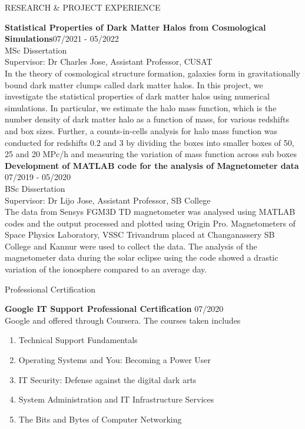 \documentclass{resume} %
\begin{document}
\begin{rSection}{RESEARCH \& PROJECT EXPERIENCE}


\textbf {Statistical Properties of Dark Matter Halos from Cosmological Simulations}\hfill 07/2021 - 05/2022 \\ 
MSc Dissertation \\
Supervisor: Dr Charles Jose, Assistant Professor, CUSAT \\
In the theory of cosmological structure formation, galaxies form in gravitationally
bound dark matter clumps called dark matter halos. In this project, we investigate
the statistical properties of dark matter halos using numerical simulations. In
particular, we estimate the halo mass function, which is the number density of dark
matter halo as a function of mass, for various redshifts and box sizes. Further, a
counts-in-cells analysis for halo mass function was conducted for redshifts 0.2 and
3 by dividing the boxes into smaller boxes of 50, 25 and 20 MPc/h and measuring
the variation of mass function across sub boxes\\


\textbf {Development of MATLAB code for the analysis of Magnetometer data}  \hfill 07/2019 - 05/2020 \\ 
BSc Dissertation\\
Supervisor: Dr Lijo Jose, Assistant Professor, SB College \\ 
The data from Sensys FGM3D TD magnetometer was analysed using MATLAB codes and the output processed and plotted using Origin Pro. Magnetometers of Space Physics Laboratory, VSSC Trivandrum placed at Changanassery SB College and Kannur were used to collect the data. The analysis of the magnetometer data during the solar eclipse using the code showed a drastic variation of the ionosphere compared to an average day. 
\end{rSection} 

\begin{rSection}{Professional Certification}

\textbf{Google IT Support Professional Certification} \hfill 07/2020\\
Google and offered through Coursera. The courses taken includes
\begin{enumerate}
	\itemsep-0.25cm
	\item Technical Support Fundamentals
	\item Operating Systems and You: Becoming a Power User
	\item IT Security: Defense against the digital dark arts
	\item System Administration and IT Infrastructure Services
	\item The Bits and Bytes of Computer Networking
\end{enumerate}

\end{rSection}
\end{document}
